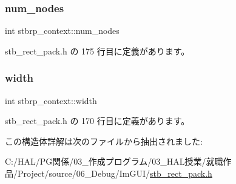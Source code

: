 \subsubsection{\texorpdfstring{num\+\_\+nodes}{num\_nodes}}
{\footnotesize\ttfamily int stbrp\+\_\+context\+::num\+\_\+nodes}



 stb\+\_\+rect\+\_\+pack.\+h の 175 行目に定義があります。

\mbox{\label{structstbrp__context_a70cfcb2044ce8397cc440d28b30c09b2}} 
\subsubsection{\texorpdfstring{width}{width}}
{\footnotesize\ttfamily int stbrp\+\_\+context\+::width}



 stb\+\_\+rect\+\_\+pack.\+h の 170 行目に定義があります。



この構造体詳解は次のファイルから抽出されました\+:\begin{DoxyCompactItemize}
\item 
C\+:/\+H\+A\+L/\+P\+G関係/03\+\_\+作成プログラム/03\+\_\+\+H\+A\+L授業/就職作品/\+Project/source/06\+\_\+\+Debug/\+Im\+G\+U\+I/\mbox{\hyperlink{stb__rect__pack_8h}{stb\+\_\+rect\+\_\+pack.\+h}}\end{DoxyCompactItemize}
